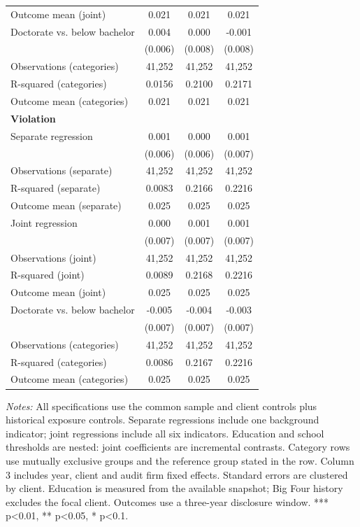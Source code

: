 \begin{table}[htbp]
\begin{threeparttable}
\begin{tabular}{p{}ccc}
Outcome mean (joint) & 0.021 & 0.021 & 0.021 \\
Doctorate vs. below bachelor & 0.004 & 0.000 & -0.001 \\
 & (0.006) & (0.008) & (0.008) \\
Observations (categories) & 41,252 & 41,252 & 41,252 \\
R-squared (categories) & 0.0156 & 0.2100 & 0.2171 \\
Outcome mean (categories) & 0.021 & 0.021 & 0.021 \\
\multicolumn{4}{l}{\textbf{Violation}} \\
Separate regression & 0.001 & 0.000 & 0.001 \\
 & (0.006) & (0.006) & (0.007) \\
Observations (separate) & 41,252 & 41,252 & 41,252 \\
R-squared (separate) & 0.0083 & 0.2166 & 0.2216 \\
Outcome mean (separate) & 0.025 & 0.025 & 0.025 \\
Joint regression & 0.000 & 0.001 & 0.001 \\
 & (0.007) & (0.007) & (0.007) \\
Observations (joint) & 41,252 & 41,252 & 41,252 \\
R-squared (joint) & 0.0089 & 0.2168 & 0.2216 \\
Outcome mean (joint) & 0.025 & 0.025 & 0.025 \\
Doctorate vs. below bachelor & -0.005 & -0.004 & -0.003 \\
 & (0.007) & (0.007) & (0.007) \\
Observations (categories) & 41,252 & 41,252 & 41,252 \\
R-squared (categories) & 0.0086 & 0.2167 & 0.2216 \\
Outcome mean (categories) & 0.025 & 0.025 & 0.025 \\
\bottomrule
\end{tabular}
\begin{tablenotes}\footnotesize
\item \raggedright \textit{Notes:} All specifications use the common sample and client controls plus historical exposure controls. Separate regressions include one background indicator; joint regressions include all six indicators. Education and school thresholds are nested: joint coefficients are incremental contrasts. Category rows use mutually exclusive groups and the reference group stated in the row. Column 3 includes year, client and audit firm fixed effects. Standard errors are clustered by client. Education is measured from the available snapshot; Big Four history excludes the focal client. Outcomes use a three-year disclosure window. *** p<0.01, ** p<0.05, * p<0.1.
\end{tablenotes}
\end{threeparttable}
\end{table}

